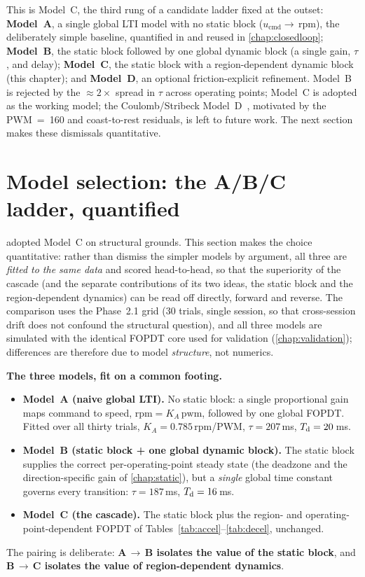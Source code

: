 This is Model~C, the third rung of a candidate ladder fixed at the outset: \textbf{Model~A}, a single global LTI model with no static block ($u_{\mathrm{cmd}}\to$\,rpm), the deliberately simple baseline, quantified in  and reused in \cref{chap:closedloop}; \textbf{Model~B}, the static block followed by one global dynamic block (a single gain, $\tau$, and delay); \textbf{Model~C}, the static block with a region-dependent dynamic block (this chapter); and \textbf{Model~D}, an optional friction-explicit refinement. Model~B is rejected by the ${\approx}2\times$ spread in $\tau$ across operating points; Model~C is adopted as the working model; the Coulomb/Stribeck Model~D~\citep{armstrong1994}, motivated by the PWM~=~160 and coast-to-rest residuals, is left to future work. The next section makes these dismissals quantitative.

\section{Model selection: the A/B/C ladder, quantified}
\label{sec:modelsel}

 adopted Model~C on structural grounds. This section makes the choice quantitative: rather than dismiss the simpler models by argument, all three are \emph{fitted to the same data} and scored head-to-head, so that the superiority of the cascade (and the separate contributions of its two ideas, the static block and the region-dependent dynamics) can be read off directly, forward and reverse. The comparison uses the Phase~2.1 grid (30 trials, single session, so that cross-session drift does not confound the structural question), and all three models are simulated with the identical FOPDT core used for validation (\cref{chap:validation}); differences are therefore due to model \emph{structure}, not numerics.

\textbf{The three models, fit on a common footing.}
\begin{itemize}
  \item \textbf{Model~A (naive global LTI).} No static block: a single proportional gain maps command to speed, $\mathrm{rpm} = K_A\,\mathrm{pwm}$, followed by one global FOPDT. Fitted over all thirty trials, $K_A = 0.785$\,rpm/PWM, $\tau = 207$\,ms, $T_{\mathrm{d}} = 20$\,ms.
  \item \textbf{Model~B (static block + one global dynamic block).} The static block supplies the correct per-operating-point steady state (the deadzone and the direction-specific gain of \cref{chap:static}), but a \emph{single} global time constant governs every transition: $\tau = 187$\,ms, $T_{\mathrm{d}} = 16$\,ms.
  \item \textbf{Model~C (the cascade).} The static block plus the region- and operating-point-dependent FOPDT of Tables~\ref{tab:accel}--\ref{tab:decel}, unchanged.
\end{itemize}
The pairing is deliberate: \textbf{A\,$\to$\,B isolates the value of the static block}, and \textbf{B\,$\to$\,C isolates the value of region-dependent dynamics}.

